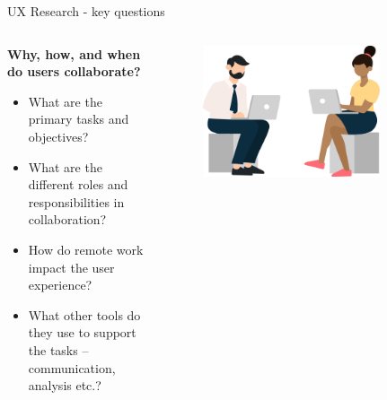 \documentclass[aspectratio=169]{beamer}
\makeatletter
\newenvironment{backgroundblock}[2]{%
  \global\setbox\@backgroundblock=\vbox\bgroup%
    \unvbox\@backgroundblock%
    \vbox to0pt\bgroup\vskip#2\hbox to0pt\bgroup\hskip#1\relax%
}{\egroup\egroup\egroup}
\newenvironment{restoretext}%
    {\@parboxrestore%
     \begin{adjustwidth}{-8mm}{-8mm}%
                \begin{lrbox}{\restorebox}%
                \begin{minipage}{\linewidth}%
    }{\end{minipage}\end{lrbox}
        \usebox\restorebox
        \end{adjustwidth}
     }
\makeatother
\begin{document}
\begin{frame}{UX Research - key questions}
    \vspace{1em}
    \begin{columns}
        \begin{column}{0.6\textwidth}
            \textbf{Why, how, and when do users collaborate?}\\
            \vspace{1em}
            \begin{itemize}
                \small
                \item What are the primary tasks and objectives?
                \item What are the different roles and responsibilities in collaboration? 
                \item How do remote work impact the user experience?
                \item What other tools do they use to support the tasks -- communication, analysis etc.?
            \end{itemize}
        \end{column}
        \begin{column}{0.4\textwidth}
            \begin{figure}[h]
                \centering
                \includegraphics[width=0.8\textwidth]{images/collaborators.png}
            \end{figure}
        \end{column}
    \end{columns}


\end{frame}
\end{document}
